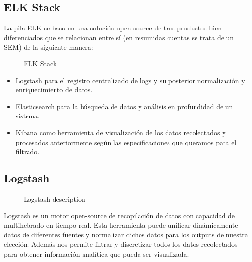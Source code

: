 \subsection{ELK Stack}

La pila ELK se basa en una solución open-source de tres productos bien diferenciados que se relacionan entre sí (en resumidas cuentas se trata de un SEM) de la siguiente manera:

\begin{figure}[H]
\caption{ELK Stack ~\cite{11}}
\end{figure}

\begin{itemize}
\item Logstash para el registro centralizado de logs y su posterior normalización y enriquecimiento de datos.
\item Elasticsearch para la búsqueda de datos y análisis en profundidad de un sistema.
\item Kibana como herramienta de visualización de los datos recolectados y procesados anteriormente según las especificaciones que queramos para el filtrado.
\end{itemize}

\subsection{Logstash}
\begin{figure}[H]
  \caption{Logstash description}
\end{figure}
Logstash es un motor open-source de recopilación de datos con capacidad de multihebrado en tiempo real. Esta herramienta puede unificar dinámicamente datos de diferentes fuentes y normalizar dichos datos para los outputs de nuestra elección. Además nos permite filtrar y discretizar todos los datos recolectados para obtener información analítica que pueda ser visualizada.\\

